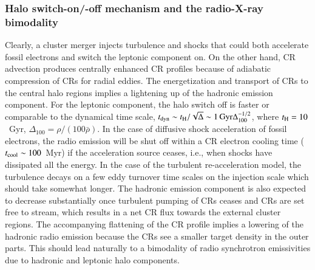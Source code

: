 \documentclass[useAMS,usenatbib]{mn2e}
\begin{document}
\subsubsection{Halo switch-on/-off mechanism and the radio-X-ray bimodality}
Clearly, a cluster merger injects turbulence and shocks that could both
accelerate fossil electrons and switch the leptonic component on. On the other
hand, CR advection produces centrally enhanced CR profiles because of adiabatic
compression of CRs for radial eddies. The energetization and transport of CRs to
the central halo regions implies a lightening up of the hadronic emission
component. For the leptonic component, the halo switch off is faster or
comparable to the dynamical time scale, $t_{\rm dyn} \sim t_{\rm
  H}/\sqrt{\Delta} \sim 1 \,{\mathrm{Gyr}} \Delta_{100}^{-1/2}$, where $t_{\rm
  H}=10$~Gyr, $\Delta_{100}=\rho/(100\bar{\rho})$. In the case of diffusive
shock acceleration of fossil electrons, the radio emission will be shut off
within a CR electron cooling time ($t_{\mathrm{cool}}\sim100$~Myr) if the
acceleration source ceases, i.e., when shocks have dissipated all the energy. In
the case of the turbulent re-acceleration model, the turbulence decays on a few
eddy turnover time scales on the injection scale which should take somewhat
longer. The hadronic emission component is also expected to decrease
substantially once turbulent pumping of CRs ceases and CRs are set free to
stream, which results in a net CR flux towards the external cluster regions. The
accompanying flattening of the CR profile implies a lowering of the hadronic
radio emission because the CRs see a smaller target density in the outer parts.
This should lead naturally to a bimodality of radio synchrotron emissivities due
to hadronic and leptonic halo components.


\end{document}
